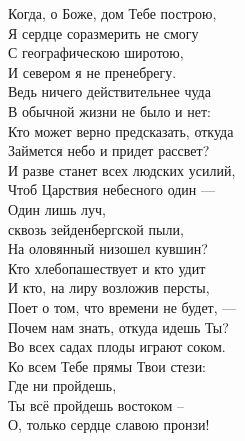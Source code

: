     \hfill
    \begin{multicols}{2}
    \footnotesize
        \noindent
        Когда, о Боже, дом Тебе построю, \\
        Я сердце соразмерить не смогу\\
        С географическою широтою,\\
        И севером я не пренебрегу. \\
        
        \noindent
        Ведь ничего действительнее чуда\\
        В обычной жизни не было и нет:\\
        Кто может верно предсказать, откуда \\
        Займется небо и придет рассвет? \\
        
        \noindent
        И разве станет всех людских усилий,\\
        Чтоб Царствия небесного один — \\
        Один лишь луч, \\ сквозь зейденбергской пыли, \\
        На оловянный низошел кувшин? \\
        
        \noindent
        Кто хлебопашествует и кто удит \\
        И кто, на лиру возложив персты, \\
        Поет о том, что времени не будет, — \\
        Почем нам знать, откуда идешь Ты? \\
        
        \noindent
        Во всех садах плоды играют соком.  \\ 
        Ко всем Тебе прямы Твои стези: \\ 
        Где ни пройдешь, \\ Ты всё пройдешь востоком – \\
        О, только сердце славою пронзи! 


\end{multicols}
